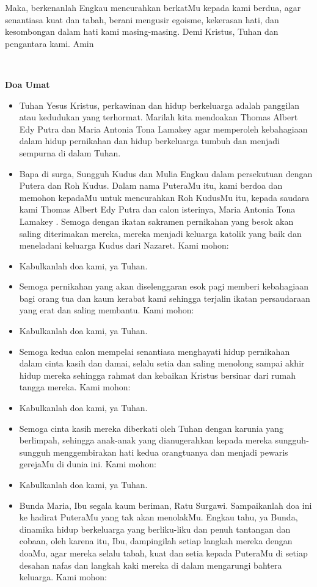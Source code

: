\documentclass[a5paper,headsepline,titlepage,11pt,nnormalheadings]{scrartcl}
\makeatletter
\newcommand{\subjudul}[1]{%
  {\parindent \z@ \normalfont
    \interlinepenalty\@M \bfseries #1\par\nobreak \vskip 20\p@ }}
\newcommand{\BU}[1]{\begin{itemize} \item[U:] #1 \end{itemize}}
\newcommand{\BP}[1]{\begin{itemize} \item[P:] #1 \end{itemize}}
\newcommand{\camantri}{Maria Antonia Tona Lamakey }
\newcommand{\camantra}{Thomas Albert Edy Putra }
\makeatother
\begin{document}
Maka, berkenanlah Engkau mencurahkan berkatMu kepada kami berdua, agar senantiasa kuat dan tabah, berani mengusir egoisme, kekerasan hati, dan kesombongan dalam hati kami masing-masing. Demi Kristus, Tuhan dan pengantara kami. Amin


\subjudul{~}
\subjudul{Doa Umat}

\BP{Tuhan Yesus Kristus, perkawinan dan hidup berkeluarga adalah panggilan atau kedudukan yang terhormat. Marilah kita mendoakan \camantra dan \camantri agar memperoleh kebahagiaan dalam hidup pernikahan dan hidup berkeluarga tumbuh dan menjadi sempurna di dalam Tuhan.}

\BP{Bapa di surga, Sungguh Kudus dan Mulia Engkau dalam persekutuan dengan Putera dan Roh Kudus. Dalam nama PuteraMu itu, kami berdoa dan memohon kepadaMu untuk mencurahkan Roh KudusMu itu, kepada saudara kami \camantra dan calon isterinya, \camantri. Semoga dengan ikatan sakramen pernikahan yang besok akan saling diterimakan mereka, mereka menjadi keluarga katolik yang baik dan meneladani keluarga Kudus dari Nazaret. Kami mohon:}

\BU{Kabulkanlah doa kami, ya Tuhan.}

\BP{Semoga pernikahan yang akan diselenggaran esok pagi
memberi kebahagiaan bagi orang tua dan kaum kerabat kami sehingga terjalin
ikatan persaudaraan yang erat dan saling membantu. Kami mohon:}

\BU{Kabulkanlah doa kami, ya Tuhan.}

\BP{Semoga kedua calon mempelai
senantiasa menghayati hidup pernikahan dalam cinta kasih dan damai, selalu
setia dan saling menolong sampai akhir hidup mereka sehingga rahmat dan
kebaikan Kristus bersinar dari rumah tangga mereka. Kami mohon:}

\BU{Kabulkanlah doa kami, ya Tuhan.}

\BP{Semoga cinta kasih mereka
diberkati oleh Tuhan dengan karunia yang berlimpah, sehingga anak-anak yang dianugerahkan
kepada mereka sungguh-sungguh menggembirakan hati kedua orangtuanya dan menjadi
pewaris gerejaMu di dunia ini. Kami mohon:}

\BU{Kabulkanlah doa kami, ya Tuhan.}

\BP{Bunda Maria, Ibu segala kaum beriman, Ratu Surgawi. Sampaikanlah doa ini ke hadirat PuteraMu yang tak akan menolakMu. Engkau tahu, ya Bunda, dinamika hidup berkeluarga yang berliku-liku dan penuh tantangan dan cobaan, oleh karena itu, Ibu, dampingilah setiap langkah mereka dengan doaMu, agar mereka selalu tabah, kuat dan setia kepada PuteraMu di setiap desahan nafas dan langkah kaki mereka di dalam mengarungi bahtera keluarga. Kami mohon:}
\end{document}
